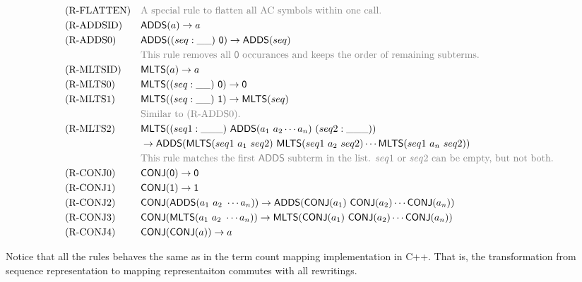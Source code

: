 \documentclass{article}
\begin{document}
\begin{figure}[h]
    \begin{align*}
        & \text{(R-FLATTEN)} &&
        \textcolor{gray}{\text{A special rule to flatten all AC symbols within one call.}} \\
        & \text{(R-ADDSID)} &&
        \ADDS(a) \to a \\
        & \text{(R-ADDS0)} &&
        \ADDS((seq:\_ \_)\ \ZERO) \to \ADDS(seq) \\
        & && \textcolor{gray}{\text{This rule removes all $\ZERO$ occurances and keeps the order of remaining subterms.}} \\
        & \text{(R-MLTSID)} &&
        \MLTS(a) \to a \\
        & \text{(R-MLTS0)} &&
        \MLTS((seq: \_ \_)\ \ZERO) \to \ZERO \\
        & \text{(R-MLTS1)} &&
        \MLTS((seq: \_ \_)\ \ONE) \to \MLTS(seq) \\
        & && \textcolor{gray}{\text{Similar to (R-ADDS0).}} \\
        & \text{(R-MLTS2)} &&
        \MLTS((seq1: \_ \_ \_)\ \ADDS(a_1\ a_2 \cdots a_n)\ (seq2: \_ \_ \_)) \\
        & && \to \ADDS(\MLTS(seq1\ a_1\ seq2)\ \MLTS(seq1\ a_2\ seq2) \cdots \MLTS(seq1\ a_n\ seq2)) \\
        & && \textcolor{gray}{\text{This rule matches the first $\ADDS$ subterm in the list. $seq1$ or $seq2$ can be empty, but not both.}} \\
        & \text{(R-CONJ0)} &&
        \CONJ(\ZERO) \to \ZERO \\
        & \text{(R-CONJ1)} &&
        \CONJ(\ONE) \to \ONE \\
        & \text{(R-CONJ2)} &&
        \CONJ(\ADDS(a_1\ a_2\ \cdots a_n)) \to \ADDS(\CONJ(a_1)\ \CONJ(a_2) \cdots \CONJ(a_n)) \\
        & \text{(R-CONJ3)} &&
        \CONJ(\MLTS(a_1\ a_2\ \cdots a_n)) \to \MLTS(\CONJ(a_1)\ \CONJ(a_2) \cdots \CONJ(a_n)) \\
        & \text{(R-CONJ4)} &&
        \CONJ(\CONJ(a)) \to a
    \end{align*}
\end{figure}

Notice that all the rules behaves the same as in the term count mapping implementation in C++. That is, the transformation from sequence representation to mapping representaiton commutes with all rewritings.

\end{document}
